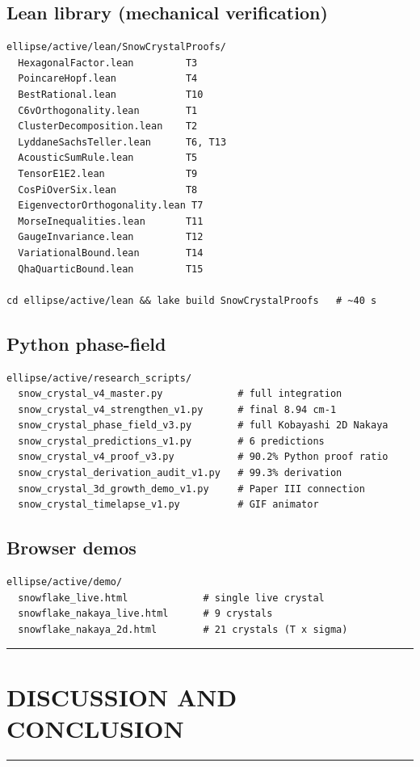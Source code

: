 \documentclass[11pt,a4paper]{article}
\begin{document}
\subsection{Lean library (mechanical verification)}
\begin{lstlisting}
ellipse/active/lean/SnowCrystalProofs/
  HexagonalFactor.lean         T3
  PoincareHopf.lean            T4
  BestRational.lean            T10
  C6vOrthogonality.lean        T1
  ClusterDecomposition.lean    T2
  LyddaneSachsTeller.lean      T6, T13
  AcousticSumRule.lean         T5
  TensorE1E2.lean              T9
  CosPiOverSix.lean            T8
  EigenvectorOrthogonality.lean T7
  MorseInequalities.lean       T11
  GaugeInvariance.lean         T12
  VariationalBound.lean        T14
  QhaQuarticBound.lean         T15

cd ellipse/active/lean && lake build SnowCrystalProofs   # ~40 s
\end{lstlisting}

\subsection{Python phase-field}
\begin{lstlisting}
ellipse/active/research_scripts/
  snow_crystal_v4_master.py             # full integration
  snow_crystal_v4_strengthen_v1.py      # final 8.94 cm-1
  snow_crystal_phase_field_v3.py        # full Kobayashi 2D Nakaya
  snow_crystal_predictions_v1.py        # 6 predictions
  snow_crystal_v4_proof_v3.py           # 90.2% Python proof ratio
  snow_crystal_derivation_audit_v1.py   # 99.3% derivation
  snow_crystal_3d_growth_demo_v1.py     # Paper III connection
  snow_crystal_timelapse_v1.py          # GIF animator
\end{lstlisting}

\subsection{Browser demos}
\begin{lstlisting}
ellipse/active/demo/
  snowflake_live.html             # single live crystal
  snowflake_nakaya_live.html      # 9 crystals
  snowflake_nakaya_2d.html        # 21 crystals (T x sigma)
\end{lstlisting}

\hrule\vspace{14pt}

\section*{\centering DISCUSSION AND CONCLUSION}
\hrule\vspace{12pt}
\end{document}
